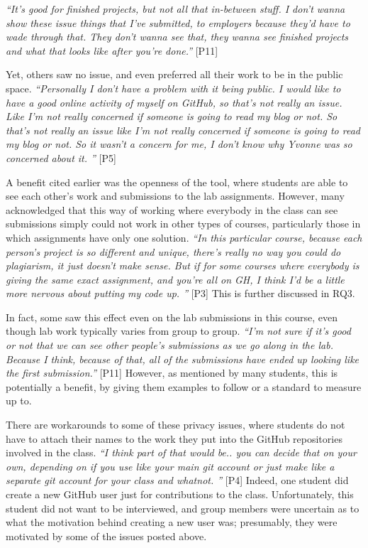 \textit{``It's good for finished projects, but not all that in-between stuff. I don't wanna show these issue things that I've submitted, to employers because they'd have to wade through that. They don't wanna see that, they wanna see finished projects and what that looks like after you're done.''} [P11]


Yet, others saw no issue, and even preferred all their work to be in the public space. \textit{``Personally I don't have a problem with it being public. I would like to have a good online activity of myself on GitHub, so that's not really an issue. Like I'm not really concerned if someone is going to read my blog or not. So that's not really an issue like I'm not really concerned if someone is going to read my blog or not. So it wasn't a concern for me, I don't know why Yvonne was so concerned about it. ''} [P5]

A benefit cited earlier was the openness of the tool, where students are able to see each other's work and submissions to the lab assignments. However, many acknowledged that this way of working where everybody in the class can see submissions simply could not work in other types of courses, particularly those in which assignments have only one solution. \textit{``In this particular course, because each person's project is so different and unique, there's really no way you could do plagiarism, it just doesn't make sense. But if for some courses where everybody is giving the same exact assignment, and you're all on GH, I think I'd be a little more nervous about putting my code up. ''} [P3] This is further discussed in RQ3.

In fact, some saw this effect even on the lab submissions in this course, even though lab work typically varies from group to group. \textit{``I'm not sure if it's good or not that we can see other people's submissions as we go along in the lab. Because I think, because of that, all of the submissions have ended up looking like the first submission.''} [P11] However, as mentioned by many students, this is potentially a benefit, by giving them examples to follow or a standard to measure up to.

There are workarounds to some of these privacy issues, where students do not have to attach their names to the work they put into the GitHub repositories involved in the class. \textit{``I think part of that would be.. you can decide that on your own, depending on if you use like your main git account or just make like a separate git account for your class and whatnot. ''} [P4] Indeed, one student did create a new GitHub user just for contributions to the class. Unfortunately, this student did not want to be interviewed, and group members were uncertain as to what the motivation behind creating a new user was; presumably, they were motivated by some of the issues posted above.


